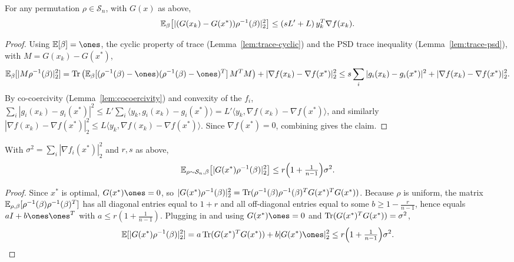 \begin{lemma}
  \label{lem:claim-E3}
  For any permutation $\rho \in \mathcal{S}_n$, with $G(x)$ as above,
  \[
    \mathbb{E}_\beta\big[|(G(x_k) - G(x^*))\rho^{-1}(\beta)|_2^2\big]
      \le (sL' + L)\, y_k^T\nabla f(x_k).
  \]
\end{lemma}
\begin{proof}
  Using $\E[\beta] = \ones$, the cyclic property of trace
  (Lemma~\ref{lem:trace-cyclic}) and the PSD trace inequality
  (Lemma~\ref{lem:trace-psd}), with $M = G(x_k) - G(x^*)$,
  \[
    \E_\beta[|M\rho^{-1}(\beta)|_2^2]
      = \Tr\big(\E_\beta[(\rho^{-1}(\beta)-\ones)(\rho^{-1}(\beta)-\ones)^T]\,M^TM\big)
        + |\nabla f(x_k) - \nabla f(x^*)|_2^2
      \le s\sum_i|g_i(x_k) - g_i(x^*)|^2 + |\nabla f(x_k) - \nabla f(x^*)|_2^2 .
  \]
  By co-coercivity (Lemma~\ref{lem:cocoercivity}) and convexity of the $f_i$,
  $\sum_i|g_i(x_k) - g_i(x^*)|^2 \le L'\sum_i\langle y_k, g_i(x_k) - g_i(x^*)\rangle
   = L'\langle y_k, \nabla f(x_k) - \nabla f(x^*)\rangle$, and similarly
  $|\nabla f(x_k) - \nabla f(x^*)|_2^2 \le L\langle y_k, \nabla f(x_k) -
  \nabla f(x^*)\rangle$. Since $\nabla f(x^*) = 0$, combining gives the claim.
\end{proof}

\begin{lemma}
  \label{lem:claim-E4}
  With $\sigma^2 = \sum_i|\nabla f_i(x^*)|_2^2$ and $r,s$ as above,
  \[
    \mathbb{E}_{\rho \sim \mathcal{S}_n, \beta}\big[|G(x^*)\rho^{-1}(\beta)|_2^2\big]
      \le r\Big(1 + \tfrac1{n-1}\Big)\sigma^2 .
  \]
\end{lemma}
\begin{proof}
  Since $x^*$ is optimal, $G(x^*)\ones = 0$, so
  $|G(x^*)\rho^{-1}(\beta)|_2^2 = \operatorname{Tr}(\rho^{-1}(\beta)\rho^{-1}(\beta)^T
   G(x^*)^TG(x^*))$. Because $\rho$ is uniform, the matrix
  $\mathbb{E}_{\rho,\beta}[\rho^{-1}(\beta)\rho^{-1}(\beta)^T]$ has all diagonal entries
  equal to $1 + r$ and all off-diagonal entries equal to some $b \ge 1 - \tfrac{r}{n-1}$,
  hence equals $aI + b\ones\ones^T$ with $a \le r(1 + \tfrac1{n-1})$. Plugging in
  and using $G(x^*)\ones = 0$ and $\operatorname{Tr}(G(x^*)^TG(x^*)) = \sigma^2$,
  \[
    \E[|G(x^*)\rho^{-1}(\beta)|_2^2]
      = a\Tr(G(x^*)^TG(x^*)) + b|G(x^*)\ones|_2^2
      \le r\Big(1 + \tfrac1{n-1}\Big)\sigma^2 . \qedhere
  \]
\end{proof}

